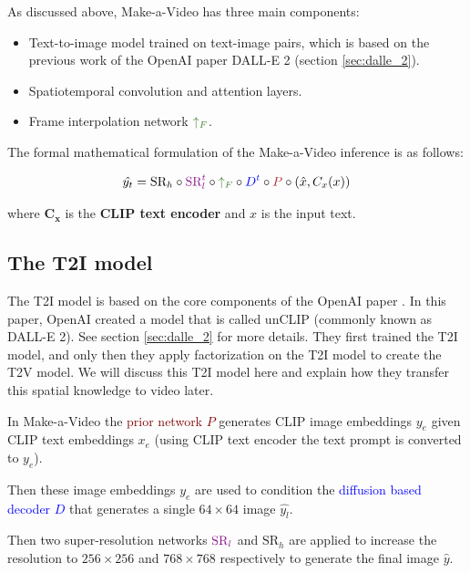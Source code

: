 As discussed above, Make-a-Video has three main components:

\begin{itemize}
    \item Text-to-image model trained on text-image pairs, which is based on the previous work of the OpenAI paper DALL-E 2 \cite{dalle_2} (section \ref{sec:dalle_2}).
    \item Spatiotemporal convolution and attention layers.
    \item Frame interpolation network $\textcolor{OliveGreen}{\uparrow_F}$.
\end{itemize}

The formal mathematical formulation of the Make-a-Video inference is as follows:

\[ \hat{y_t} = \text{SR}_h \circ \textcolor{Plum}{\text{SR}_l^t} \circ \textcolor{OliveGreen}{\uparrow_F} \circ \textcolor{blue}{D^t} \circ \textcolor{Maroon}{P} \circ \left( \hat{x}, C_x (x) \right) \]

where $\mathbf{C_x}$ is the \textbf{CLIP text encoder} and $x$ is the input text.







\subsection{The T2I model}

The T2I model is based on the core components of the OpenAI paper \cite{dalle_2}. In this paper, OpenAI created a model that is called unCLIP (commonly known as DALL-E 2). See section \ref{sec:dalle_2} for more details. They first trained the T2I model, and only then they apply factorization on the T2I model to create the T2V model. We will discuss this T2I model here and explain how they transfer this spatial knowledge to video later.

In Make-a-Video the \textcolor{Maroon}{prior network $P$} generates CLIP image embeddings $y_e$ given CLIP text embeddings $x_e$ (using CLIP text encoder the text prompt is converted to $y_e$).

Then these image embeddings $y_e$ are used to condition the \textcolor{blue}{diffusion based decoder $D$} that generates a single $64\times 64$ image $\hat{y_l}$.

Then two super-resolution networks $\textcolor{Plum}{\text{SR}_l}$ and $\text{SR}_h$ are applied to increase the resolution to $256\times 256$ and $768\times 768$ respectively to generate the final image $\hat{y}$.

